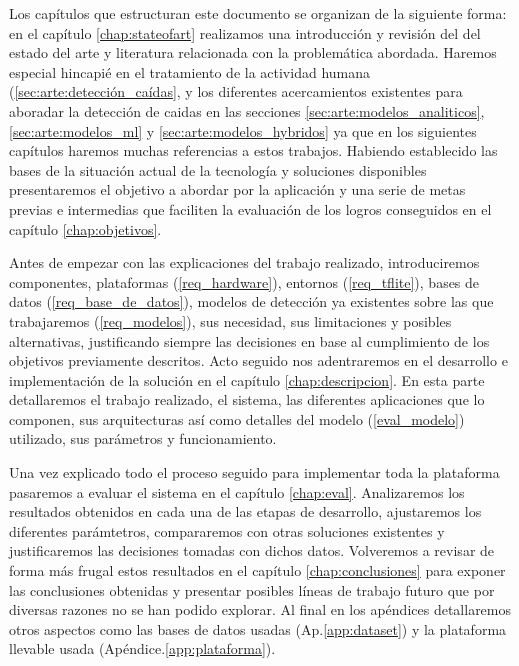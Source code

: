 Los capítulos que estructuran este documento se organizan de la siguiente forma: en el capítulo \ref{chap:stateofart} realizamos una introducción y revisión del del estado del arte y literatura relacionada con la problemática abordada. Haremos especial hincapié en el tratamiento de la actividad humana (\ref{sec:arte:detección_caídas}, y los diferentes acercamientos existentes para aboradar la detección de caidas en las secciones \ref{sec:arte:modelos_analiticos},\ref{sec:arte:modelos_ml} y \ref{sec:arte:modelos_hybridos} ya que en los siguientes capítulos haremos muchas referencias a estos trabajos. Habiendo establecido las bases de la situación actual de la tecnología y soluciones disponibles presentaremos el objetivo a abordar por la aplicación y una serie de metas previas e intermedias que faciliten la evaluación de los logros conseguidos en el capítulo \ref{chap:objetivos}.   

Antes de empezar con las explicaciones del trabajo realizado, introduciremos componentes, plataformas (\ref{req_hardware}), entornos (\ref{req_tflite}), bases de datos (\ref{req_base_de_datos}), modelos de detección ya existentes sobre las que trabajaremos (\ref{req_modelos}), sus necesidad, sus limitaciones y posibles alternativas, justificando siempre las decisiones en base al cumplimiento de los objetivos previamente descritos. Acto seguido nos adentraremos en el desarrollo e implementación de la solución en el capítulo \ref{chap:descripcion}. En esta parte detallaremos el trabajo realizado, el sistema, las diferentes aplicaciones que lo componen, sus arquitecturas así como detalles del modelo (\ref{eval_modelo}) utilizado, sus parámetros y funcionamiento.

Una vez explicado todo el proceso seguido para implementar toda la plataforma pasaremos a evaluar el sistema en el capítulo \ref{chap:eval}. Analizaremos los resultados obtenidos en cada una de las etapas de desarrollo, ajustaremos los diferentes parámtetros, compararemos con otras soluciones existentes y justificaremos las decisiones tomadas con dichos datos. Volveremos a revisar de forma más frugal estos resultados en el capítulo \ref{chap:conclusiones} para exponer las conclusiones obtenidas y presentar posibles líneas de trabajo futuro que por diversas razones no se han podido explorar. Al final en los apéndices detallaremos otros aspectos como las bases de datos usadas (Ap.\ref{app:dataset}) y la plataforma llevable usada (Apéndice.\ref{app:plataforma}).

%
